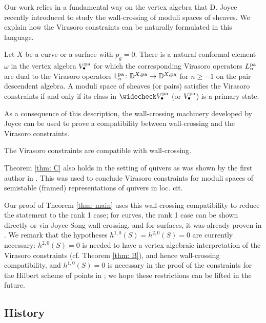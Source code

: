 \documentclass[a4paper, 12pt]{amsart}
\begin{document}
Our work relies in a fundamental way on the vertex algebra that D. Joyce recently introduced \cite{Jo17,GJT, Jo21} to study the wall-crossing of moduli spaces of sheaves. We explain how the Virasoro constraints can be naturally formulated in this language.

\begin{thm}[=Theorem \ref{thm: duality} and Theorem \ref{thm: virasorophysical}]\label{thm: B}
Let $X$ be a curve or a surface with $p_g=0$. There is a natural conformal element $\omega$ in the vertex algebra $V_\bullet^{\mathop{\rm pa}\nolimits}$ for which the corresponding Virasoro operators $L_n^{\mathop{\rm pa}\nolimits}$ are dual to the Virasoro operators ${\mathsf{L}}_n^{\mathop{\rm pa}\nolimits}\colon {\mathbb{D}}^{X,\mathop{\rm pa}\nolimits}\to {\mathbb{D}}^{X,\mathop{\rm pa}\nolimits}$ for $n\geq -1$ on the pair descendent algebra. A moduli space of sheaves (or pairs) satisfies the Virasoro constraints if and only if its class in $\widecheck V_\bullet^{\pa}$ (or $V_\bullet^{\mathop{\rm pa}\nolimits}$) is a primary state.
\end{thm}


As a consequence of this description, the wall-crossing machinery developed by Joyce can be used to prove a compatibility between wall-crossing and the Virasoro constraints.
\begin{thm}[=Propositions \ref{prop: wallcrossingcompatibility1} and \ref{prop: wallcrossingcompatibility2}]\label{thm: C}
The Virasoro constraints are compatible with wall-crossing.
\end{thm}
Theorem \ref{thm: C} also holds in the setting of quivers as was shown by the first author in \cite[Theorem 1.2]{BoVir}. This was used to conclude Virasoro constraints for moduli spaces of semistable (framed) representations of quivers in loc. cit.

Our proof of Theorem \ref{thm: main} uses this wall-crossing compatibility to reduce the statement to the rank 1 case; for curves, the rank 1 case can be shown directly or via Joyce-Song wall-crossing, and for surfaces, it was already proven in \cite{moop, moreira}. We remark that the hypotheses $h^{1,0}(S)=h^{2,0}(S)=0$ are currently necessary: $h^{2,0}(S)=0$ is needed to have a vertex algebraic interpretation of the Virasoro constraints (cf. Theorem \ref{thm: B}), and hence wall-crossing compatibility, and $h^{1,0}(S)=0$ is necessary in the proof of the constraints for the Hilbert scheme of points in \cite{moreira}; we hope these restrictions can be lifted in the future.


\subsection{History}
\label{sec: history of Virasoro constraints }\hfill
\end{document}
